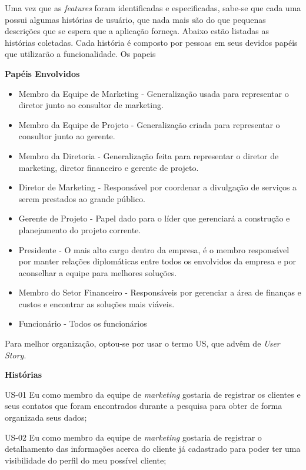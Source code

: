 Uma vez que as \textit{features} foram identificadas e especificadas, sabe-se que cada uma possui algumas histórias de usuário, que nada mais são do que pequenas descrições que se espera que a aplicação forneça. Abaixo estão listadas as histórias coletadas. Cada história é composto por pessoas em seus devidos papéis que utilizarão a funcionalidade. Os papeis 

\textbf{Papéis Envolvidos}\begin{itemize}
\item Membro da Equipe de Marketing - Generalização usada para representar o diretor junto ao consultor de marketing.

\item Membro da Equipe de Projeto - Generalização criada para representar o consultor junto ao gerente.

\item Membro da Diretoria - Generalização feita para representar o diretor de marketing, diretor financeiro e gerente de projeto.

\item Diretor de Marketing - Responsável por coordenar a divulgação de serviços a serem prestados ao grande público.

\item Gerente de Projeto - Papel dado para o líder que gerenciará a construção e planejamento do projeto corrente.

\item Presidente - O mais alto cargo dentro da empresa, é o membro responsável por manter relações diplomáticas entre todos os envolvidos da empresa e por aconselhar a equipe para melhores soluções.

\item Membro do Setor Financeiro - Responsáveis por gerenciar a área de finanças e custos e encontrar as soluções mais viáveis. 

\item Funcionário - Todos os funcionários
\end{itemize}


Para melhor organização, optou-se por usar o termo US, que advêm de \textit{User Story}.

\textbf{Histórias}

US-01 Eu como membro da equipe de \textit{marketing} gostaria de registrar os clientes e seus contatos que foram encontrados durante a pesquisa para obter de forma organizada seus dados;


US-02 Eu como membro da equipe de \textit{marketing} gostaria de registrar o detalhamento das informações acerca do cliente já cadastrado para poder ter uma visibilidade do perfil do meu possível cliente;


